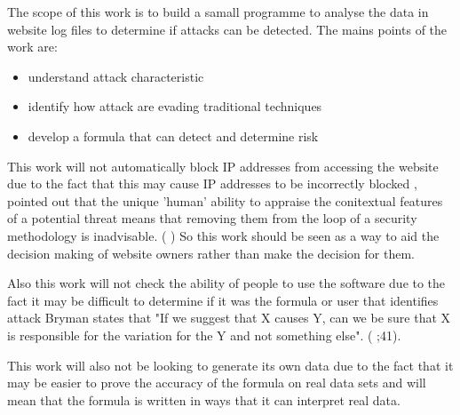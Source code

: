 The scope of this work is to build a samall programme to analyse the data in website log files to determine if attacks can be detected. The mains points of the work are:
\begin{itemize}
    \item understand attack characteristic
    \item identify how attack are evading traditional techniques 
    \item develop a formula that can detect and determine risk
\end{itemize}

This work will not automatically block IP addresses from accessing the website due to the fact that this may cause IP addresses to be incorrectly blocked \citeauthor{TargetedCyberSecurity}, pointed out that the unique 'human' ability to appraise the conitextual features of a potential threat means that removing them from the loop of a security methodology is inadvisable. (\cite{TargetedCyberSecurity} ) So this work should be seen as a way to aid the decision making of website owners rather than make the decision for them. 

Also this work will not check the ability of people to use the software due to the fact it may be difficult to determine if it was the formula or user that identifies attack Bryman states that "If we suggest that X causes Y, can we be sure that X is responsible for the variation for the Y and not something else". (\citeauthor{bryman_2016} \citeyear{bryman_2016};41).


This work will also not be looking to generate its own data due to the fact that it may be easier to prove the accuracy of the formula on real data sets and will mean that the formula is written in ways that it can interpret real data.